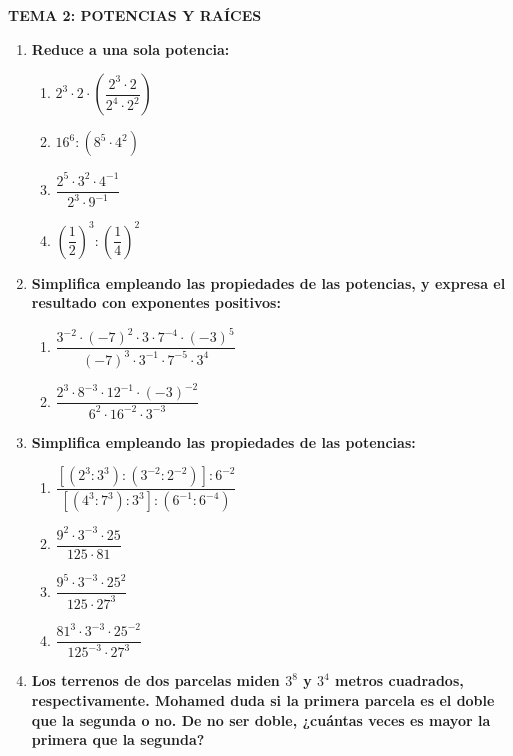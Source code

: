 \documentclass[a4paper,12pt]{article}
\begin{document}
\begin{center}
    \Large\textbf{\color{primary} TEMA 2: POTENCIAS Y RAÍCES}
\end{center}

\begin{enumerate}

    \item \textbf{Reduce a una sola potencia:}
        \begin{enumerate}[label=\alph*)]
            \item $2^{3} \cdot 2 \cdot \left(\dfrac{2^{3} \cdot 2}{2^{4} \cdot 2^{2}}\right)$
            \item $16^{6} : (8^{5} \cdot 4^{2})$
            \item $\dfrac{2^{5} \cdot 3^{2} \cdot 4^{-1}}{2^{3} \cdot 9^{-1}}$
            \item $\left(\dfrac{1}{2}\right)^{3} : \left(\dfrac{1}{4}\right)^{2}$
        \end{enumerate}

    \item \textbf{Simplifica empleando las propiedades de las potencias, y expresa el resultado con exponentes positivos:}
        \begin{enumerate}[label=\alph*)]
            \item $\dfrac{3^{-2} \cdot (-7)^{2} \cdot 3 \cdot 7^{-4} \cdot (-3)^{5}}{(-7)^{3} \cdot 3^{-1} \cdot 7^{-5} \cdot 3^{4}}$
            \item $\dfrac{2^{3} \cdot 8^{-3} \cdot 12^{-1} \cdot (-3)^{-2}}{6^{2} \cdot 16^{-2} \cdot 3^{-3}}$
        \end{enumerate}

    \item \textbf{Simplifica empleando las propiedades de las potencias:}
        \begin{enumerate}[label=\alph*)]
            \item $\dfrac{[(2^{3}:3^{3}):(3^{-2}:2^{-2})]:6^{-2}}{[(4^{3}:7^{3}):3^{3}]:(6^{-1}:6^{-4})}$
            \item $\dfrac{9^{2} \cdot 3^{-3} \cdot 25}{125 \cdot 81}$
            \item $\dfrac{9^{5} \cdot 3^{-3} \cdot 25^{2}}{125 \cdot 27^{3}}$
            \item $\dfrac{81^{3} \cdot 3^{-3} \cdot 25^{-2}}{125^{-3} \cdot 27^{3}}$
        \end{enumerate}

    \item \textbf{Los terrenos de dos parcelas miden $3^{8}$ y $3^{4}$ metros cuadrados, respectivamente. Mohamed duda si la primera parcela es el doble que la segunda o no. De no ser doble, ¿cuántas veces es mayor la primera que la segunda?}


\end{enumerate}
\end{document}
